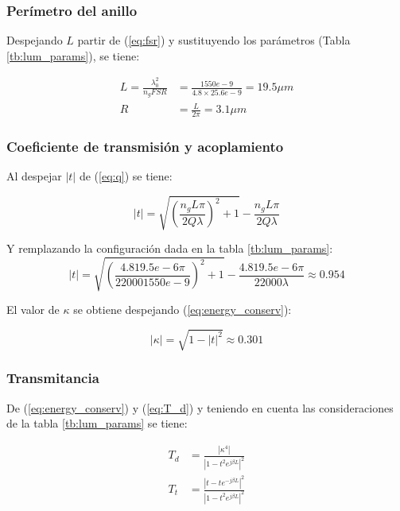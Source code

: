 \subsubsection{Perímetro del anillo}

Despejando $L$ partir de (\ref{eq:fsr}) y sustituyendo los parámetros 
(Tabla \ref{tb:lum_params}), se tiene:

\begin{align*}
L=\frac{\lambda_0^2}{n_g FSR} 
&=\frac{1550e-9}{4.8 \times 25.6e-9}
 =19.5 \mu m  \\ %
R &= \frac{L}{2 \pi} = 3.1 \mu m  %
\end{align*}

\subsubsection{Coeficiente de transmisión y acoplamiento} 

Al despejar $|t|$ de (\ref{eq:q}) se tiene:

\begin{equation}
|t|=\sqrt{ \left( \frac{n_g L \pi}{2 Q \lambda} \right) ^2 + 1} - 
    \frac{n_g L \pi}{2 Q \lambda}
\label{eq:t}
\end{equation} 

Y remplazando la configuración dada en la tabla \ref{tb:lum_params}:
\begin{equation*}
|t|=\sqrt{ \left( \frac{4.8 19.5e-6 \pi}{2 2000 1550e-9} \right) ^2 + 1} - 
    \frac{4.8 19.5e-6 \pi}{2 2000 \lambda}
   \approx 0.954
\label{eq:lum_t}
\end{equation*}

El valor de $\kappa$ se obtiene despejando (\ref{eq:energy_conserv}):

\begin{equation}
|\kappa|=\sqrt{1 - |t|^2} \approx 0.301
\label{eq:lum_k}
\end{equation} 

\subsubsection{Transmitancia}

De (\ref{eq:energy_conserv}) y (\ref{eq:T_d}) y teniendo en cuenta 
las consideraciones de la tabla \ref{tb:lum_params} se tiene:

\begin{align}
T_d&=\frac{|\kappa^4|}{|1 - t^2 e^{j \beta L}|^2} \label{eq:lum_Td} \\
T_t&=\frac{|t -t e^{-j \beta L}|^2}{|1 - t^2 e^{j \beta L}|^2} \label{eq:lum_Tt} 
\end{align} 
